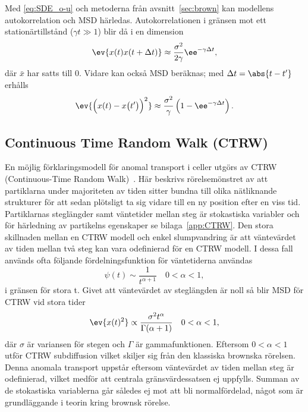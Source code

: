 Med \eqref{eq:SDE_o-u} och metoderna från avsnitt~\ref{sec:brown} kan modellens autokorrelation och MSD härledas. Autokorrelationen i gränsen mot ett stationärtillstånd ($\gamma t\gg 1$) blir då i en dimension
\begin{equation}\label{eq:COV_o-u}
\ev{x(t)x(t+\Delta{t})} \approx \frac{\sigma^2}{2\gamma} \ee^{-\gamma\Delta{t}},
\end{equation}
där $\bar{x}$ har satts till 0. Vidare kan också MSD beräknas; med $\Delta{t}=\abs{t-t'}$ erhålls
\begin{equation}\label{eq:MSD_o-u}
\ev{\Big(x(t)-x\big(t'\big) \Big)^2} 
\approx \frac{\sigma^2}{\gamma} \left( 1-\ee^{-\gamma \Delta{t}} \right).
\end{equation}




\subsection{Continuous Time Random Walk (CTRW)}
En möjlig förklaringsmodell för anomal transport i celler utgörs av CTRW (Continuous-Time Random Walk)~\cite{Hofling&Franosch2013}. Här beskrivs rörelsemönstret av att partiklarna under majoriteten av tiden sitter bundna till olika nätliknande strukturer för att sedan plötsligt ta sig vidare till en ny position efter en viss tid. Partiklarnas steglängder samt väntetider mellan steg är stokastiska variabler och för härledning av partikelns egenskaper se bilaga~\ref{app:CTRW}. Den stora skillnaden mellan en CTRW modell och enkel slumpvandring är att väntevärdet av tiden mellan två steg kan vara odefinierad för en CTRW modell. I dessa fall används ofta \cite{Hofling&Franosch2013} följande fördelningsfunktion för väntetiderna användas
\begin{equation}
\psi(t) \sim \frac{1}{t^{\alpha+1}}\quad 0<\alpha<1,
\end{equation}
i gränsen för stora t.
Givet att väntevärdet av steglängden är noll så blir MSD för CTRW vid stora tider
\begin{equation}\label{eq:CTRW_MSD}
    \ev{x(t)^2} \propto \frac{\sigma^2t^{\alpha}}{\Gamma (\alpha+1)}\quad 0<\alpha<1,
\end{equation}
där $\sigma$ är variansen för stegen och $\Gamma$ är gammafunktionen. Eftersom $0<\alpha<1$ utför CTRW subdiffusion vilket skiljer sig från den klassiska brownska rörelsen. Denna anomala transport uppstår eftersom väntevärdet av tiden mellan steg är odefinierad, vilket medför att centrala gränsvärdessatsen ej uppfylls. Summan av de stokastiska variablerna går således ej mot att bli normalfördelad, något som är grundläggande i teorin kring brownsk rörelse.


